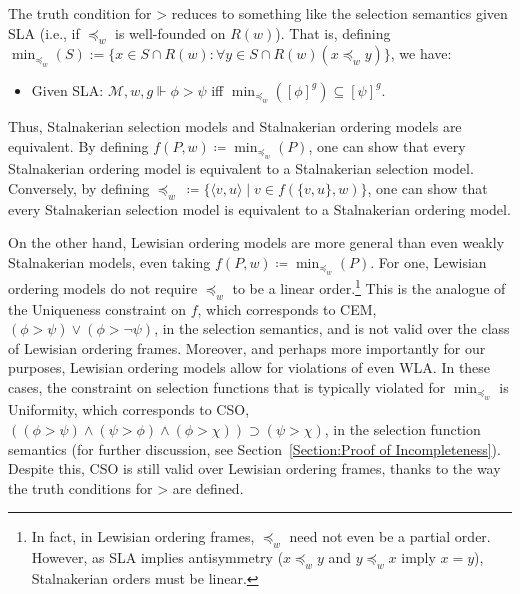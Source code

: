 \documentclass[12pt]{article}
\newcommand{\tup}[1]{\langle #1 \rangle}
\newcommand{\would}{\mathbin{>}}
\newcommand{\then}{\mathbin{\supset}}
\begin{document}
The truth condition for $\would$ reduces to something like the selection semantics given SLA (i.e., if $\preceq_w$ is well-founded on $R(w)$). 
That is, defining $\min_{\preceq_w}(S):=\{x\in S\cap{R(w)}:\forall{y\in{S\cap{R(w)}}}(x\preceq_{w}y)\}$, we have:
\begin{itemize}
    \item[$\would$.] Given SLA: $\mathcal{M},w,g \Vdash \phi \would \psi$ iff $\min_{\preceq_w}([\phi]^g) \subseteq [\psi]^g$.
\end{itemize}
Thus, Stalnakerian selection models and Stalnakerian ordering models are equivalent. By defining $f(P,w) \coloneqq \min_{\preceq_w}(P)$, one can show that every Stalnakerian ordering model is equivalent to a Stalnakerian selection model. Conversely, by defining $\preceq_w \ \coloneqq \{\tup{v,u} \mid v \in f(\{v,u\},w)\}$, one can show that every Stalnakerian selection model is equivalent to a Stalnakerian ordering model.

On the other hand, Lewisian ordering models are more general than even weakly Stalnakerian models, even taking $f(P,w) \coloneqq \min_{\preceq_w}(P)$. 
For one, Lewisian ordering models do not require $\preceq_w$ to be a linear order.\footnote{In fact, in Lewisian ordering frames, $\preceq_w$ need not even be a partial order. However, as SLA implies antisymmetry ($x\preceq_w y$ and $y\preceq_w x$ imply $x=y$), Stalnakerian orders must be linear.} 
This is the analogue of the Uniqueness constraint on $f$, which corresponds to CEM, $(\phi \would \psi) \vee (\phi \would \neg\psi)$, in the selection semantics, and is not valid over the class of Lewisian ordering frames. 
Moreover, and perhaps more importantly for our purposes, Lewisian ordering models allow for violations of even WLA. 
In these cases, the constraint on selection functions that is typically violated for $\min_{\preceq_w}$ is Uniformity, which corresponds to CSO, $((\phi \would \psi) \wedge (\psi \would \phi) \wedge (\phi \would \chi)) \then (\psi \would \chi)$, in the selection function semantics (for further discussion, see Section~\ref{Section:Proof of Incompleteness}). 
Despite this, CSO is still valid over Lewisian ordering frames, thanks to the way the truth conditions for $\would$ are defined. 
\end{document}
